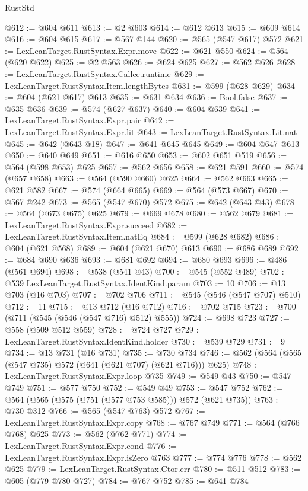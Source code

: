 \begin{lexlean}{RustStd}
\begin{coremodule}
{\begin{coremodule}
{{{{{{{{{{{{{@612 := @604 @611
@613 := @2 @603
@614 := @612 @613
@615 := @609 @614
@616 := @604 @615
@617 := @567 @144
@620 := @565 (@547 @617) @572
@621 := LexLeanTarget.RustSyntax.Expr.move
@622 := @621 @550
@624 := @564 (@620 @622)
@625 := @2 @563
@626 := @624 @625
@627 := @562 @626
@628 := LexLeanTarget.RustSyntax.Callee.runtime
@629 := LexLeanTarget.RustSyntax.Item.lengthBytes
@631 := @599 (@628 @629)
@634 := @604 (@621 @617) @613
@635 := @631 @634
@636 := Bool.false
@637 := @635 @636
@639 := @574 (@627 @637)
@640 := @604 @639
@641 := LexLeanTarget.RustSyntax.Expr.pair
@642 := LexLeanTarget.RustSyntax.Expr.lit
@643 := LexLeanTarget.RustSyntax.Lit.nat
@645 := @642 (@643 @18)
@647 := @641 @645 @645
@649 := @604 @647 @613
@650 := @640 @649
@651 := @616 @650
@653 := @602 @651 @519
@656 := @564 (@598 @653) @625
@657 := @562 @656
@658 := @621 @591
@660 := @574 (@657 @658)
@663 := @564 (@590 @660) @625
@664 := @562 @663
@665 := @621 @582
@667 := @574 (@664 @665)
@669 := @564 (@573 @667)
@670 := @567 @242
@673 := @565 (@547 @670) @572
@675 := @642 (@643 @43)
@678 := @564 (@673 @675) @625
@679 := @669 @678
@680 := @562 @679
@681 := LexLeanTarget.RustSyntax.Expr.succeed
@682 := LexLeanTarget.RustSyntax.Item.natEq
@684 := @599 (@628 @682)
@686 := @604 (@621 @568)
@689 := @604 (@621 @670) @613
@690 := @686 @689
@692 := @684 @690 @636
@693 := @681 @692
@694 := @680 @693
@696 := @486 (@561 @694)
@698 := @538 (@541 @43)
@700 := @545 (@552 @489)
@702 := @539 LexLeanTarget.RustSyntax.IdentKind.param
@703 := 10
@706 := @13 @703 (@16 @703)
@707 := @702 @706
@711 := @545 (@546 (@547 @707) @510)
@712 := 11
@715 := @13 @712 (@16 @712)
@716 := @702 @715
@723 := @700 (@711 (@545 (@546 (@547 @716) @512) @555))
@724 := @698 @723
@727 := @558 (@509 @512 @559)
@728 := @724 @727
@729 := LexLeanTarget.RustSyntax.IdentKind.holder
@730 := @539 @729
@731 := 9
@734 := @13 @731 (@16 @731)
@735 := @730 @734
@746 := @562 (@564 (@565 (@547 @735) @572 (@641 (@621 @707) (@621 @716))) @625)
@748 := LexLeanTarget.RustSyntax.Expr.loop @735
@749 := @549 @43
@750 := @547 @749
@751 := @577 @750
@752 := @549 @49
@753 := @547 @752
@762 := @564 (@565 (@575 (@751 (@577 @753 @585))) @572 (@621 @735))
@763 := @730 @312
@766 := @565 (@547 @763) @572
@767 := LexLeanTarget.RustSyntax.Expr.copy
@768 := @767 @749
@771 := @564 (@766 @768) @625
@773 := @562 (@762 @771)
@774 := LexLeanTarget.RustSyntax.Expr.cond
@776 := LexLeanTarget.RustSyntax.Expr.isZero @763
@777 := @774 @776
@778 := @562 @625
@779 := LexLeanTarget.RustSyntax.Ctor.err
@780 := @511 @512
@783 := @605 (@779 @780 @727)
@784 := @767 @752
@785 := @641 @784
}}}}}}}}}}}}}
\end{coremodule}}
\end{coremodule}
\end{lexlean}
